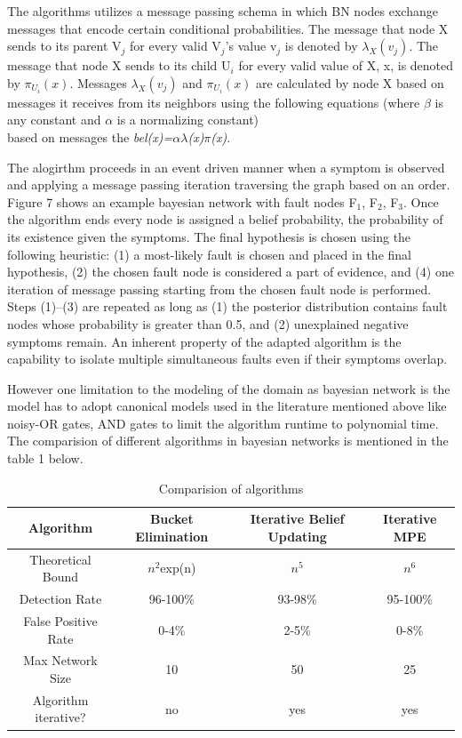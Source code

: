 \documentclass[10pt]{sigplan-proc-varsize}
\begin{document}
The algorithms  utilizes a message passing schema in which BN nodes exchange messages that encode certain conditional probabilities. The message that node X sends to its parent V$_j$ for every valid V$_j$'s value v$_j$ is denoted by ${\lambda}_X(v_j)$. The message that node X sends to its child U$_i$ for every valid value of X, x, is denoted by ${\pi}_{U_i}(x)$. Messages ${\lambda}_X(v_j)$ and ${\pi}_{U_i}(x)$ are calculated by node X based on messages it receives from its neighbors using the following equations (where $\beta$ is any constant and $\alpha$ is a normalizing constant)
\\
based on messages the {\it bel(x)={$\alpha$}{$\lambda$}(x){$\pi$}(x)}.

The alogirthm proceeds in an event driven manner when a symptom is observed and applying a message passing iteration traversing the graph based on an order. Figure 7 shows an example bayesian network with fault nodes F$_1$, F$_2$, F$_3$. Once the algorithm ends every node is assigned a belief probability, the probability of its existence given the symptoms. The final hypothesis is chosen using the following heuristic: (1) a most-likely fault is chosen and placed in the final hypothesis, (2) the chosen fault node is considered a part of evidence, and (4) one iteration of message passing starting from the chosen fault node is performed. Steps (1)–(3) are repeated as long as (1) the posterior distribution contains fault nodes whose probability is greater than 0.5, and (2) unexplained negative symptoms remain. An inherent property of the adapted algorithm is the capability to isolate multiple simultaneous faults even if their symptoms overlap. 

However one limitation to the modeling of the domain as bayesian network is the model has to adopt canonical models used in the literature mentioned above like noisy-OR gates, AND gates to limit the algorithm runtime to polynomial time. The comparision of different algorithms in bayesian networks is mentioned in the table 1 below.

\begin{center}
\begin{table}[ht]
{\small
\hfill{}
    \begin{tabular}{ | c | c | c | c |}
    \hline
    Algorithm & Bucket Elimination & Iterative Belief Updating & Iterative MPE \\ \hline
    Theoretical Bound & $n^2$exp(n) & $n^5$ & $n^6$ \\ \hline
    Detection Rate & 96-100\% & 93-98\% & 95-100\% \\ \hline
    False Positive Rate & 0-4\% & 2-5\% & 0-8\% \\ \hline
    Max Network Size & 10 & 50 & 25 \\ \hline
    Algorithm iterative? & no & yes & yes \\
    \hline
    \end{tabular}}
\hfill{}
\caption{Comparision of algorithms}
\label{tb:tablename}
\end{table}
\end{center}
\end{document}
